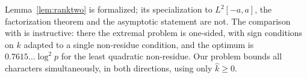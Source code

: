 \begin{remark}
Lemma~\ref{lem:ranktwo} is formalized; its specialization to $L^2[-a,a]$, the factorization theorem and the
asymptotic statement are not. The comparison with \cite{cmqr2024} is instructive: there the extremal problem is
one-sided, with sign conditions on $k$ adapted to a single non-residue condition, and the optimum is
$0.7615\ldots\log^2p$ for the least quadratic non-residue. Our problem bounds all characters simultaneously,
in both directions, using only $\hat k\ge0$.
\end{remark}
